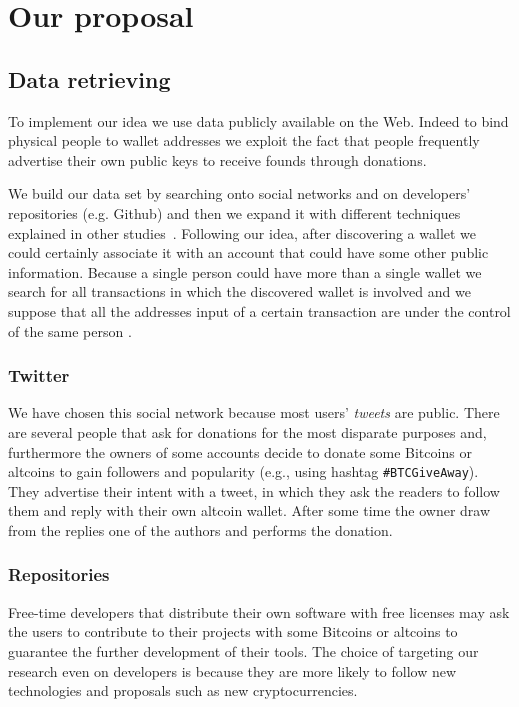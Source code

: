 \section{Our proposal}
\label{proposal}

\subsection{Data retrieving}
To implement our idea we use data publicly available on the Web. Indeed
to bind physical people to wallet addresses we exploit the fact that
people frequently advertise their own public keys to receive founds
through donations.

We build our data set by searching onto social networks and on developers'
repositories (e.g. Github) and then we expand it with different techniques
explained in other studies~\cite{bib:fistful}. Following our idea, after
discovering a wallet we could certainly associate it with an account that could
have some other public information. Because a single person could have more
than a single wallet we search for all transactions in which the
discovered wallet is involved
and we suppose that all the addresses input of a certain transaction are under
the control of the same person \cite{bib:satoshi, bib:deanon, bib:fistful}.

\subsubsection*{Twitter}
We have chosen this social network because most users' \textit{tweets} are
public. There are several people that ask for donations for the most disparate
purposes and, furthermore the owners of some accounts decide to donate some
Bitcoins or altcoins to gain followers and popularity (e.g., using hashtag
\texttt{\#BTCGiveAway}). They advertise their intent with a tweet, in which
they ask the readers to follow them and reply with their own altcoin wallet.
After some time the owner draw from the replies one of the authors and performs
the donation.

\subsubsection*{Repositories}
Free-time developers that distribute their own software with free licenses may
ask the users to contribute to their projects with some Bitcoins or altcoins to
guarantee the further development of their tools. The choice of targeting our
research even on developers is because they are more likely to follow new
technologies and proposals such as new cryptocurrencies.

